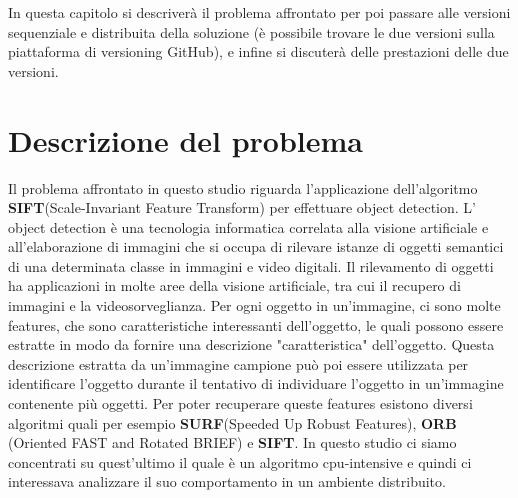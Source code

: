 In questa capitolo si descriverà il problema affrontato per poi passare alle versioni sequenziale e distribuita della soluzione (è possibile trovare le due versioni sulla piattaforma di versioning GitHub), e infine si discuterà delle prestazioni delle due versioni.
\section{Descrizione del problema}
Il problema affrontato in questo studio riguarda l'applicazione dell'algoritmo \textbf{SIFT}(Scale-Invariant Feature Transform) per effettuare object detection. L' object detection è una tecnologia informatica correlata alla visione artificiale e all'elaborazione di immagini che si occupa di rilevare istanze di oggetti semantici di una determinata classe in immagini e video digitali. Il rilevamento di oggetti ha applicazioni in molte aree della visione artificiale, tra cui il recupero di immagini e la videosorveglianza. Per ogni oggetto in un'immagine, ci sono molte features, che sono caratteristiche interessanti dell'oggetto, le quali possono essere estratte in modo da fornire una descrizione "caratteristica" dell'oggetto. Questa descrizione estratta da un'immagine campione può poi essere utilizzata per identificare l'oggetto durante il tentativo di individuare l'oggetto in un'immagine contenente più oggetti. Per poter recuperare queste features esistono diversi algoritmi quali per esempio \textbf{SURF}(Speeded Up Robust Features), \textbf{ORB} (Oriented FAST and Rotated BRIEF) e \textbf{SIFT}. In questo studio ci siamo concentrati su quest'ultimo il quale è un algoritmo cpu-intensive e quindi ci interessava analizzare il suo comportamento in un ambiente distribuito.
